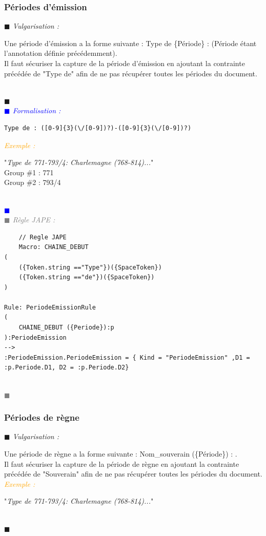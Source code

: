 \documentclass[a4paper, 11pt]{report}
\newenvironment{vulgarisation}
    {
    \textit{\textcolor{dark-blue}{$\blacksquare$  Vulgarisation : \\}}

    }
    {
    ~\\\textcolor{dark-blue}{$\blacksquare$}\\
    }
\newenvironment{formalisation}
    {
    \textit{\textcolor{blue}{$\blacksquare$  Formalisation : \\}}
    }
    {
    ~\\\textcolor{blue}{$\blacksquare$}\\
    }
\newenvironment{codage}
    {
    \textit{\textcolor{gray}{$\blacksquare$  Règle JAPE : \\}}
    }
    {
    ~\\\textcolor{gray}{$\blacksquare$}\\
    }
\newenvironment{exemple}
    {
    \textit{\textcolor{orange}{
    Exemple : \\}}
    }
    {~\\
    }
\begin{document}
\newpage
\subsubsection{Périodes d'émission}
\begin{vulgarisation}
    Une période d'émission a la forme suivante :  \og Type de \{Période\} : \fg{} (Période étant l'annotation définie précédemment).\\
    Il faut sécuriser la capture de la période d'émission en ajoutant la contrainte précédée de "Type de" afin de ne pas récupérer toutes les périodes du document.
\end{vulgarisation}
\begin{formalisation}
    \begin{verbatim}
Type de : ([0-9]{3}(\/[0-9])?)-([0-9]{3}(\/[0-9])?)
    \end{verbatim}
    \begin{exemple}
        "\emph{Type de 771-793/4: Charlemagne (768-814)...}" \\
        Group \#1 : 771 \\
        Group \#2 : 793/4
    \end{exemple}

\end{formalisation}
            \begin{codage}
    \begin{lstlisting}
    // Regle JAPE
    Macro: CHAINE_DEBUT
(
    ({Token.string =="Type"})({SpaceToken})
    ({Token.string =="de"})({SpaceToken})
)

Rule: PeriodeEmissionRule
(
    CHAINE_DEBUT ({Periode}):p
):PeriodeEmission
-->
:PeriodeEmission.PeriodeEmission = { Kind = "PeriodeEmission" ,D1 = :p.Periode.D1, D2 = :p.Periode.D2}
    \end{lstlisting}
    \end{codage}

\subsubsection{Périodes de règne}
\begin{vulgarisation}
    Une période de règne a la forme suivante : \og Nom\_souverain (\{Période\}) : \fg{}.\\
    Il faut sécuriser la capture de la période de règne en ajoutant la contrainte précédée de "Souverain" afin de ne pas récupérer toutes les périodes du document.\\
    \begin{exemple}
        "\emph{Type de 771-793/4: Charlemagne (768-814)...}" 
    \end{exemple}
\end{vulgarisation}
\end{document}
